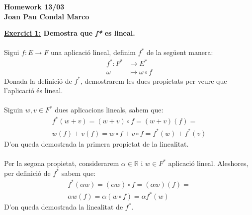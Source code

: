 \documentclass[a4paper, 11pt]{article}
\begin{document}
    \begin{center}
        \Large
        \textbf{
            Homework 13/03\\
            Joan Pau Condal Marco\\
        }
    \end{center}

    \noindent\textbf{\large \underline{Exercici 1:} \normalsize Demostra que \emph{f*} es lineal.}\\\\
    Sigui $ f: E \longrightarrow F $ una aplicació lineal, definim $f^*$ de la seg\"uent manera:
    \begin{align*}
        f^*: F^* &\longrightarrow E^*\\
        \omega &\mapsto \omega \circ f
    \end{align*}
    Donada la definici\'o de $ f^* $, demostrarem les dues propietats per veure que l'aplicaci\'o \'es lineal.\\\\
    Siguin $ w,v \in F^* $ dues aplicacions lineals, sabem que:
    \begin{gather*}
        f^* (w+v) = (w+v) \circ f = (w+v)(f) =\\
        w(f) + v(f) = w \circ f + v \circ f = f^*(w) + f^*(v)
    \end{gather*}
    D'on queda demostrada la primera propietat de la linealitat.\\\\
    Per la segona propietat, considerarem $ \alpha \in \mathbb{R} \text{ i } w \in F^* $ aplicaci\'o lineal. Aleshores, per definici\'o de $ f^* $ sabem que:
    \begin{gather*}
        f^*(\alpha w) = (\alpha w) \circ f = (\alpha w)(f) =\\
        \alpha w(f) = \alpha (w \circ f) = \alpha f^*(w)
    \end{gather*}
    D'on queda demostrada la linealitat de $ f^* $.\\\\
\end{document}

